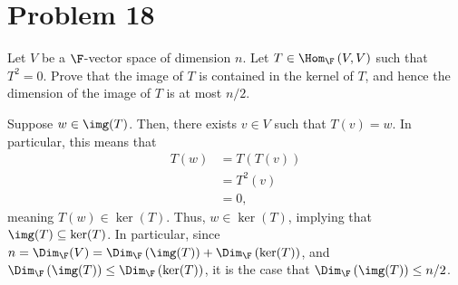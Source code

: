 \documentclass[12pt]{mypackage}
\begin{document}
\section{Problem 18}%
\begin{problem}
  Let $V$ be a $\F$-vector space of dimension $n$. Let $T\in \Hom_{\F}\left(V,V\right)$ such that $T^2 = 0$. Prove that the image of $T$ is contained in the kernel of $T$, and hence the dimension of the image of $T$ is at most $n/2$.
\end{problem}
\begin{solution}
  Suppose $w\in \img(T)$. Then, there exists $v\in V$  such that $T(v) = w$. In particular, this means that
  \begin{align*}
    T(w) &= T\left(T(v)\right)\\
         &= T^2\left(v\right)\\
         &= 0,
  \end{align*}
  meaning $T(w)\in \ker(T)$. Thus, $w\in \ker(T)$, implying that $\img(T)\subseteq \ker(T)$. In particular, since $n = \Dim_{\F}(V) = \Dim_{\F}\left(\img(T)\right) + \Dim_{\F}\left(\ker(T)\right)$, and $\Dim_{\F}\left(\img(T)\right) \leq \Dim_{\F}\left(\ker(T)\right)$, it is the case that $\Dim_{\F}\left(\img(T)\right) \leq n/2$.
\end{solution}
\end{document}
